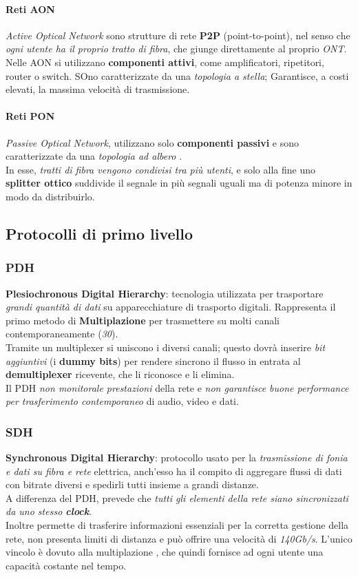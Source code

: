\documentclass[a4paper,11pt]{article}
\def\vedi#1{\nameref{#1}}
\begin{document}
\paragraph{Reti AON} \textit{Active Optical Network} sono strutture di rete \textbf{P2P }(point-to-point), nel senso che \textit{ogni utente ha il proprio tratto di fibra}, che giunge direttamente al proprio \textit{ONT}. \\Nelle AON si utilizzano \textbf{componenti attivi}, come amplificatori, ripetitori, router o switch. SOno caratterizzate da una \textit{topologia a stella}; Garantisce, a costi elevati, la massima velocità di trasmissione.
\paragraph{Reti PON} \textit{Passive Optical Network},
utilizzano solo \textbf{componenti passivi }e sono caratterizzate da una \textit{topologia ad albero }. \\In esse, \textit{tratti di fibra vengono condivisi tra più utenti}, e solo alla fine uno \textbf{splitter ottico }suddivide il segnale in più segnali uguali ma di potenza minore in modo da distribuirlo.\newpage
\subsection{Protocolli di primo livello}
\subsubsection{PDH}
\textbf{Plesiochronous Digital Hierarchy}: tecnologia utilizzata per trasportare \textit{grandi quantità di dati} su apparecchiature di trasporto digitali. Rappresenta il primo metodo di \textbf{Multiplazione} per trasmettere su molti canali contemporaneamente (\textit{30}).\\
Tramite un multiplexer \vedi{TDM} si uniscono i diversi canali; questo dovrà inserire \textit{bit aggiuntivi }(i \textbf{dummy bits}) per rendere sincrono il flusso in entrata al \textbf{demultiplexer }ricevente, che li riconosce e li elimina.\\
Il PDH \textit{non monitorale prestazioni }della rete e \textit{non garantisce buone performance per trasferimento contemporaneo }di audio, video e dati. 
\subsubsection{SDH}
\textbf{Synchronous Digital Hierarchy}: protocollo usato per la \textit{trasmissione di fonia e dati su fibra e rete }elettrica, anch'esso ha il compito di aggregare flussi di dati con bitrate diversi e spedirli tutti insieme a grandi distanze.\\
A differenza del PDH, prevede che \textit{tutti gli elementi
della rete siano sincronizzati da uno stesso \textbf{clock}}. \\Inoltre permette di trasferire informazioni essenziali per la corretta gestione della rete, non presenta limiti di distanza e può offrire una velocità di \textit{140Gb/s}. L'unico vincolo è dovuto alla multiplazione \vedi{TDM}, che quindi fornisce ad ogni utente una capacità costante nel tempo.
\end{document}

